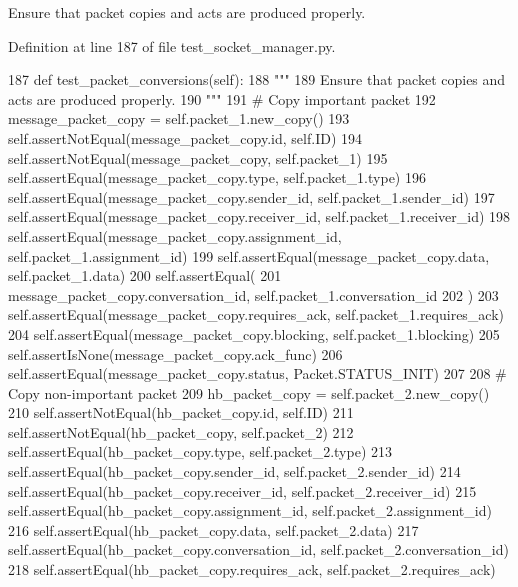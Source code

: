 \begin{DoxyVerb}Ensure that packet copies and acts are produced properly.
\end{DoxyVerb}
 

Definition at line 187 of file test\+\_\+socket\+\_\+manager.\+py.


\begin{DoxyCode}
187     \textcolor{keyword}{def }test\_packet\_conversions(self):
188         \textcolor{stringliteral}{"""}
189 \textcolor{stringliteral}{        Ensure that packet copies and acts are produced properly.}
190 \textcolor{stringliteral}{        """}
191         \textcolor{comment}{# Copy important packet}
192         message\_packet\_copy = self.packet\_1.new\_copy()
193         self.assertNotEqual(message\_packet\_copy.id, self.ID)
194         self.assertNotEqual(message\_packet\_copy, self.packet\_1)
195         self.assertEqual(message\_packet\_copy.type, self.packet\_1.type)
196         self.assertEqual(message\_packet\_copy.sender\_id, self.packet\_1.sender\_id)
197         self.assertEqual(message\_packet\_copy.receiver\_id, self.packet\_1.receiver\_id)
198         self.assertEqual(message\_packet\_copy.assignment\_id, self.packet\_1.assignment\_id)
199         self.assertEqual(message\_packet\_copy.data, self.packet\_1.data)
200         self.assertEqual(
201             message\_packet\_copy.conversation\_id, self.packet\_1.conversation\_id
202         )
203         self.assertEqual(message\_packet\_copy.requires\_ack, self.packet\_1.requires\_ack)
204         self.assertEqual(message\_packet\_copy.blocking, self.packet\_1.blocking)
205         self.assertIsNone(message\_packet\_copy.ack\_func)
206         self.assertEqual(message\_packet\_copy.status, Packet.STATUS\_INIT)
207 
208         \textcolor{comment}{# Copy non-important packet}
209         hb\_packet\_copy = self.packet\_2.new\_copy()
210         self.assertNotEqual(hb\_packet\_copy.id, self.ID)
211         self.assertNotEqual(hb\_packet\_copy, self.packet\_2)
212         self.assertEqual(hb\_packet\_copy.type, self.packet\_2.type)
213         self.assertEqual(hb\_packet\_copy.sender\_id, self.packet\_2.sender\_id)
214         self.assertEqual(hb\_packet\_copy.receiver\_id, self.packet\_2.receiver\_id)
215         self.assertEqual(hb\_packet\_copy.assignment\_id, self.packet\_2.assignment\_id)
216         self.assertEqual(hb\_packet\_copy.data, self.packet\_2.data)
217         self.assertEqual(hb\_packet\_copy.conversation\_id, self.packet\_2.conversation\_id)
218         self.assertEqual(hb\_packet\_copy.requires\_ack, self.packet\_2.requires\_ack)

\end{DoxyCode}
